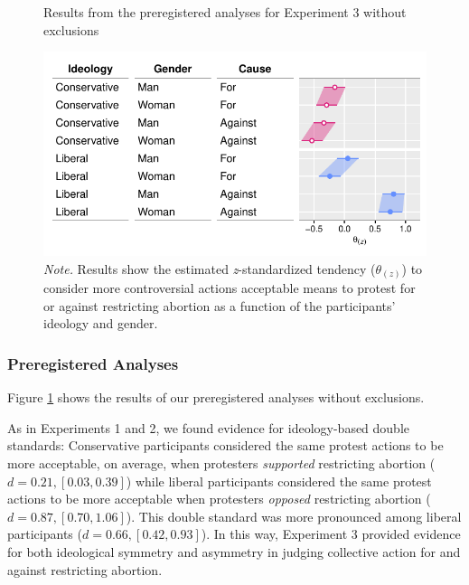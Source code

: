 \documentclass[12pt, letterpaper]{article}
\begin{document}
\begin{figure}[!t]
\centering
\caption{Results from the preregistered analyses for Experiment 3 without exclusions}
\includegraphics[scale=1]{../Experiment 3/figures/figure-s5}
\caption*{\textit{Note.} Results show the estimated \textit{z}-standardized tendency ($\theta_{(z)}$) to consider more controversial actions acceptable means to protest for or against restricting abortion as a function of the participants' ideology and gender.}
\label{fig:s5}
\end{figure}

\hypertarget{preregistered-analyses-1}{%
\subsubsection{Preregistered Analyses}\label{preregistered-analyses-1}}

Figure \ref{fig:s5} shows the results of our preregistered analyses
without exclusions.

As in Experiments 1 and 2, we found evidence for ideology-based double
standards: Conservative participants considered the same protest actions
to be more acceptable, on average, when protesters \emph{supported}
restricting abortion (\(d = 0.21, [0.03, 0.39]\)) while liberal
participants considered the same protest actions to be more acceptable
when protesters \emph{opposed} restricting abortion
(\(d = 0.87, [0.70, 1.06]\)). This double standard was more pronounced
among liberal participants (\(d = 0.66, [0.42, 0.93]\)). In this way,
Experiment 3 provided evidence for both ideological symmetry and
asymmetry in judging collective action for and against restricting
abortion.
\end{document}
